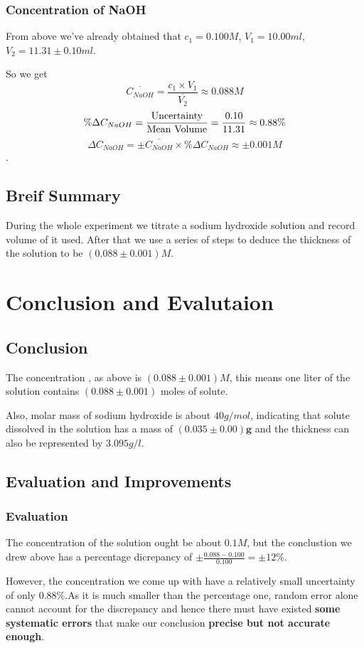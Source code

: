 \documentclass[12pt]{article}
\begin{document}
\subsubsection{Concentration of NaOH}
From above we've already obtained that $c_1 = 0.100M$, $V_1 = 10.00ml$, $V_2 = 11.31 \pm 0.10ml$.\par
So we get $$\overline{C_{NaOH}} = \frac{c_1 \times V_1}{\overline{V_2}} \approx 0.088M $$ $$\% \Delta C_{NaOH} = \frac{{\rm Uncertainty}}{{\rm Mean \ Volume}} = \frac{0.10}{11.31} \approx 0.88 \%$$  $$\Delta C_{NaOH} = \pm \overline{C_{NaOH}} \times \% \Delta C_{NaOH} \approx \pm 0.001M$$. 
\subsection{Breif Summary}
During the whole experiment we titrate a sodium hydroxide solution and record volume of it used. After that we use a series of steps to deduce the thickness of the solution to be $(0.088 \pm 0.001)M$.
\section{Conclusion and Evalutaion}
\subsection{Conclusion}
The concentration , as above is $\bm{(0.088 \pm 0.001)}M$, this means one liter of the solution contains $\bm{(0.088 \pm 0.001)}$ moles of solute.\par
Also, molar mass of sodium hydroxide is about $40g/mol$, indicating that solute dissolved in the solution has a mass of $\bm{(0.035 \pm 0.00)g}$ and the thickness can also be represented by $3.095g/l$.
\subsection{Evaluation and Improvements}
\subsubsection{Evaluation}
The concentration of the solution ought be about $0.1M$, but the conclustion we drew above has a percentage dicrepancy of $\displaystyle{\pm \frac{0.088 - 0.100}{0.100}} =\pm 12\%$.\par
However, the concentration we come up with have a relatively small uncertainty of only $ 0.88\%$.As it is much smaller than the percentage one, random error alone cannot account for the discrepancy and hence there must have existed \textbf{some systematic errors} that make our conclusion \textbf{precise but not accurate enough}.\par
\end{document}
